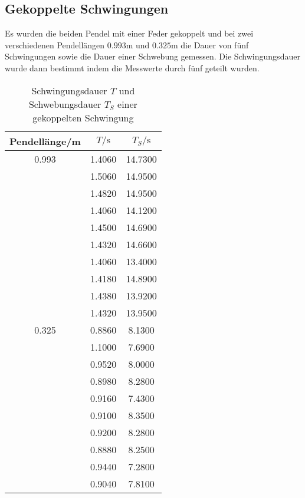   \subsection{Gekoppelte Schwingungen}
    Es wurden die beiden Pendel mit einer Feder gekoppelt und bei zwei verschiedenen Pendellängen $0.993$m und $0.325$m die Dauer
    von fünf Schwingungen sowie die Dauer einer Schwebung gemessen. Die Schwingungsdauer wurde dann bestimmt indem die Messwerte
    durch fünf geteilt wurden.
    \begin{table}[H]
      \centering
        \caption{Schwingungsdauer $T$ und Schwebungsdauer $T_{S}$ einer gekoppelten Schwingung}
        \label{tab:aufgabe4}
        \begin{tabular}{S S S}
          \toprule
          {Pendellänge/m} & {$T/\si{\second}$} & {$T_{S}/\si{\second}$} \\
             &   1.4060 &     14.7300 \\
                  &   1.5060 &     14.9500 \\
                  &   1.4820 &     14.9500 \\
                  &   1.4060 &     14.1200 \\
                  &   1.4500 &     14.6900 \\
                  &   1.4320 &     14.6600 \\
                  &   1.4060 &     13.4000 \\
                  &   1.4180 &     14.8900 \\
                  &   1.4380 &     13.9200 \\
                  &   1.4320 &     13.9500 \\
          0.325   &   0.8860 &     8.1300 \\
                  &   1.1000 &     7.6900 \\
                  &   0.9520 &     8.0000 \\
                  &   0.8980 &     8.2800 \\
                  &   0.9160 &     7.4300 \\
                  &   0.9100 &     8.3500 \\
                  &   0.9200 &     8.2800 \\
                  &   0.8880 &     8.2500 \\
                  &   0.9440 &     7.2800 \\
                  &   0.9040 &     7.8100 \\
          \bottomrule
        \end{tabular}
      \end{table}
      \noindent

